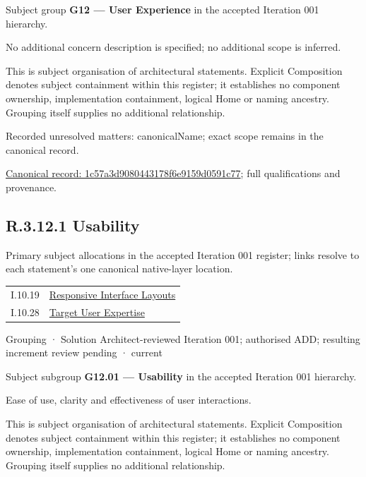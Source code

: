 Subject group \textbf{G12 — User Experience} in the accepted Iteration 001 hierarchy.



No additional concern description is specified; no additional scope is inferred.



This is subject organisation of architectural statements. Explicit Composition denotes subject containment within this register; it establishes no component ownership, implementation containment, logical Home or naming ancestry. Grouping itself supplies no additional relationship.


{\small Recorded unresolved matters: canonicalName; exact scope remains in the canonical record.}\par
{\footnotesize \href{../../../../continuum/grouping/1c57a3d9080443178f6e9159d0591c77.md}{Canonical record: 1c57a3d9080443178f6e9159d0591c77}; full qualifications and provenance.}\par
\subsection*{R.3.12.1 Usability}
\label{navigation:R.3.12.1}

Primary subject allocations in the accepted Iteration 001 register; links resolve to each statement’s one canonical native-layer location.\par
\begin{longtable}{p{.22\linewidth}p{.73\linewidth}}
I.10.19 & \hyperref[element:2e276eda09a94670bee0619468947895]{Responsive Interface Layouts} \\
I.10.28 & \hyperref[element:1c0b0e15434d47b1b08ad86e087a45d1]{Target User Expertise} \\
\end{longtable}
\label{element:58c3577b30fd4748836a1d52e07c8a98}
{\small Grouping · Solution Architect-reviewed Iteration 001; authorised ADD; resulting increment review pending · current}\par

Subject subgroup \textbf{G12.01 — Usability} in the accepted Iteration 001 hierarchy.



Ease of use, clarity and effectiveness of user interactions.



This is subject organisation of architectural statements. Explicit Composition denotes subject containment within this register; it establishes no component ownership, implementation containment, logical Home or naming ancestry. Grouping itself supplies no additional relationship.



